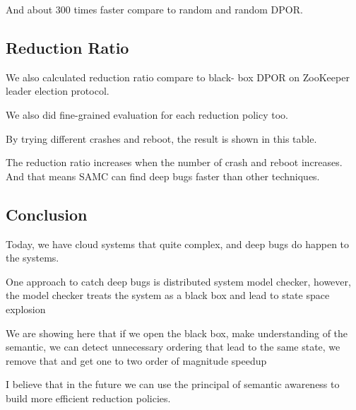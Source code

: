 And about 300 times faster compare to random and random DPOR.

\subsection{Reduction Ratio}

We also calculated reduction ratio compare to black- box DPOR on ZooKeeper
leader election protocol.

We also did fine-grained evaluation for each reduction policy too.

By trying different crashes and reboot, the result is shown in this table.

The reduction ratio increases when the number of crash and reboot increases. And
that means SAMC can find deep bugs faster than other techniques.

\subsection{Conclusion}

Today, we have cloud systems that quite complex, and deep bugs do happen to the
systems.

One approach to catch deep bugs is distributed system model checker, however,
the model checker treats the system as a black box and lead to state space
explosion

We are showing here that if we open the black box, make understanding of the
semantic, we can detect unnecessary ordering that lead to the same state, we
remove that and get one to two order of magnitude speedup

I believe that in the future we can use the principal of semantic awareness to
build more efficient reduction policies.

